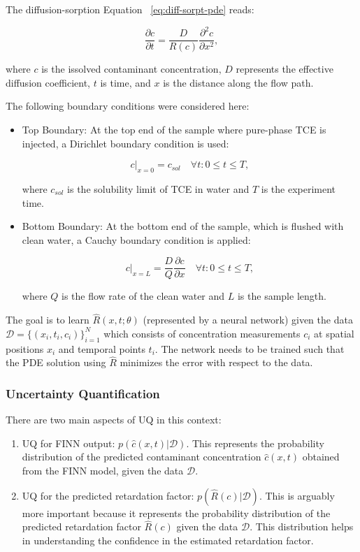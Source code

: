The diffusion-sorption Equation ~\vref{eq:diff-sorpt-pde} reads:

\begin{equation}
    \frac{\partial c}{\partial t} = \frac{D}{R(c)} \frac{\partial^2 c}{\partial x^2},
    \label{eq:diff-sorpt-pde}
\end{equation}

where $c$ is the issolved contaminant concentration, $D$ represents the effective diffusion coefficient, $t$ is time, and $x$ is the distance along the flow path.

The following boundary conditions were considered here:

\begin{itemize}
    \item Top Boundary: At the top end of the sample where pure-phase TCE is injected, a Dirichlet boundary condition is used:

    \begin{equation}
        c|_{x=0} = c_{sol} \quad \forall t : 0 \leq t \leq T,
    \end{equation}

    where $c_{sol}$ is the solubility limit of TCE in water and $T$ is the experiment time.

    \item Bottom Boundary: At the bottom end of the sample, which is flushed with clean water, a Cauchy boundary condition is applied:

    \begin{equation}
        c|_{x=L} = \frac{D}{Q} \frac{\partial c}{\partial x} \quad \forall t : 0 \leq t \leq T,
    \end{equation}

    where $Q$ is the flow rate of the clean water and $L$ is the sample length.
\end{itemize}

The goal is to learn $\hat{R}(x,t;\theta)$ (represented by a neural network) given the data $\mathcal{D} = \{ (x_i, t_i, c_i) \}_{i=1}^N$ which consists of concentration measurements $c_i$ at spatial positions $x_i$ and temporal points $t_i$. The network needs to be trained such that the PDE solution using $\hat{R}$ minimizes the error with respect to the data.

\subsubsection{Uncertainty Quantification}
There are two main aspects of UQ in this context:
\begin{enumerate}
    \item UQ for FINN output: $p(\hat{c}(x,t) | \mathcal{D})$. This represents the probability distribution of the predicted contaminant concentration $\hat{c}(x,t)$ obtained from the FINN model, given the data $\mathcal{D}$.
    \item UQ for the predicted retardation factor: $p(\hat{R}(c) | \mathcal{D})$. This is arguably more important because it represents the probability distribution of the predicted retardation factor $\hat{R}(c)$ given the data $\mathcal{D}$. This distribution helps in understanding the confidence in the estimated retardation factor.
\end{enumerate}

